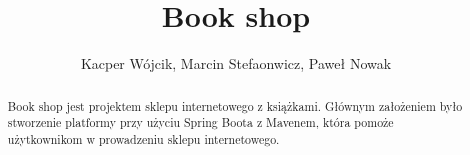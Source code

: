 \documentclass[]{article}
\title{Book shop}
\author{Kacper Wójcik, Marcin Stefaonwicz, Paweł Nowak}
\begin{document}
\maketitle

\begin{abstract}
	Book shop jest projektem sklepu internetowego z książkami. Głównym założeniem było stworzenie platformy przy użyciu Spring Boota z Mavenem, która pomoże użytkownikom w prowadzeniu sklepu internetowego.

\end{abstract}

\section{}
\end{document}
